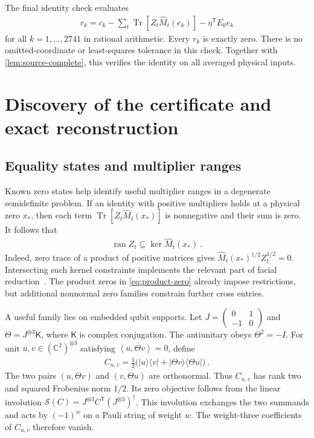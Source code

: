 \documentclass[aps,pra,reprint,superscriptaddress,amsmath,amssymb,floatfix,nofootinbib]{revtex4-2}
\newcommand{\Tr}{\operatorname{Tr}}
\newcommand{\ran}{\operatorname{ran}}
\newcommand{\ip}[2]{\left\langle#1,#2\right\rangle}
\newcommand{\C}{\mathbb C}
\begin{document}
The final identity check evaluates
\begin{align}
 r_k=c_k-\sum_t\Tr\!\left[Z_t\widehat M_t(e_k)\right]
                  -\eta^{\mathsf T}E_0e_k
 \label{eq:residual-check}
\end{align}
for all $k=1,\ldots,2741$ in rational arithmetic.
Every $r_k$ is exactly zero. There is no omitted-coordinate or
least-squares tolerance in this check.
Together with \cref{lem:source-complete}, this verifies the identity on
all averaged physical inputs.

\section{Discovery of the certificate and exact reconstruction}
\label{app:discovery}

\subsection{Equality states and multiplier ranges}

Known zero states help identify useful multiplier ranges in a degenerate
semidefinite problem. If an identity with positive multipliers holds at a
physical zero $x_*$, then each term
$\Tr[Z_t\widehat M_t(x_*)]$ is nonnegative and their sum is zero.
It follows that
\begin{align}
 \ran Z_t\subseteq\ker\widehat M_t(x_*)\ .
 \label{eq:face-condition}
\end{align}
Indeed, zero trace of a product of positive matrices gives
$\widehat M_t(x_*)^{1/2}Z_t^{1/2}=0$.
Intersecting such kernel constraints implements the relevant part of
facial reduction~\cite{PermenterParrilo}.
The product zeros in \cref{eq:product-zero} already impose restrictions,
but additional nonnormal zero families constrain further cross entries.

A useful family lies on embedded qubit supports.
Let $J=\begin{pmatrix}0&1\\-1&0\end{pmatrix}$ and
$\Theta=J^{\otimes3}\mathsf K$, where $\mathsf K$ is complex conjugation.
The antiunitary obeys $\Theta^2=-I$.
For unit $u,v\in(\C^2)^{\otimes3}$ satisfying
$\ip u{\Theta v}=0$, define
\begin{align}
 C_{u,v}=\frac12\bigl(|u\rangle\langle v|
             +|\Theta v\rangle\langle\Theta u|\bigr)\ .
 \label{eq:crossed-antistate}
\end{align}
The two pairs $(u,\Theta v)$ and $(v,\Theta u)$ are orthonormal.
Thus $C_{u,v}$ has rank two and squared Frobenius norm $1/2$.
Its zero objective follows from the linear involution
$\mathcal S(C)=J^{\otimes3}C^{\mathsf T}(J^{\otimes3})^\dagger$.
This involution exchanges the two summands and acts by $(-1)^w$ on a
Pauli string of weight $w$. The weight-three coefficients of $C_{u,v}$
therefore vanish.
\end{document}
